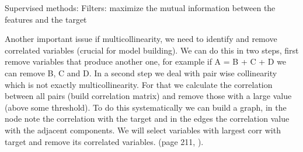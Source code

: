 \documentclass[11pt]{article}
\begin{document}
Supervised methods: Filters: maximize the mutual information between the features and the target

Another important issue if multicollinearity, we need to identify and remove correlated variables (crucial for model building). We can do this in two steps, first remove variables that produce another one, for example if A = B + C + D we can remove B, C and D.
In a second step we deal with pair wise collinearity which is not exactly multicollinearity. For that we calculate the correlation between all pairs (build correlation matrix) and remove those with a large value (above some threshold). To do this systematically we can build a graph, in the node note the correlation with the target and in the edges the correlation value with the adjacent components. We will select variables with largest corr with target and remove its correlated variables. (page 211, \cite{wu2012foundations}).
\end{document}
